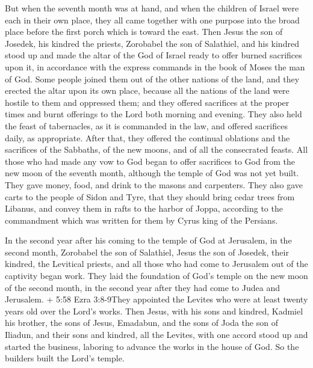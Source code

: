 But when the seventh month was at hand, and when the
children of Israel were each in their own place, they all came together
with one purpose into the broad place before the first porch which is
toward the east.  Then Jesus the son of Josedek, his
kindred the priests, Zorobabel the son of Salathiel, and his kindred
stood up and made the altar of the God of Israel ready  to
offer burned sacrifices upon it, in accordance with the express commands
in the book of Moses the man of God.  Some people joined
them out of the other nations of the land, and they erected the altar
upon its own place, because all the nations of the land were hostile to
them and oppressed them; and they offered sacrifices at the proper times
and burnt offerings to the Lord both morning and evening. 
They also held the feast of tabernacles, as it is commanded in the law,
and offered sacrifices daily, as appropriate.  After that,
they offered the continual oblations and the sacrifices of the Sabbaths,
of the new moons, and of all the consecrated feasts.  All
those who had made any vow to God began to offer sacrifices to God from
the new moon of the seventh month, although the temple of God was not
yet built.  They gave money, food, and drink to the masons
and carpenters.  They also gave carts to the people of
Sidon and Tyre, that they should bring cedar trees from Libanus, and
convey them in rafts to the harbor of Joppa, according to the
commandment which was written for them by Cyrus king of the Persians.

 In the second year after his coming to the temple of God
at Jerusalem, in the second month, Zorobabel the son of Salathiel, Jesus
the son of Josedek, their kindred, the Levitical priests, and all those
who had come to Jerusalem out of the captivity began work. 
They laid the foundation of God's temple on the new moon of the second
month, in the second year after they had come to Judea and Jerusalem.
 + 5:58 Ezra 3:8-9They appointed the Levites who were at
least twenty years old over the Lord's works. Then Jesus, with his sons
and kindred, Kadmiel his brother, the sons of Jesus, Emadabun, and the
sons of Joda the son of Iliadun, and their sons and kindred, all the
Levites, with one accord stood up and started the business, laboring to
advance the works in the house of God. So the builders built the Lord's
temple.

